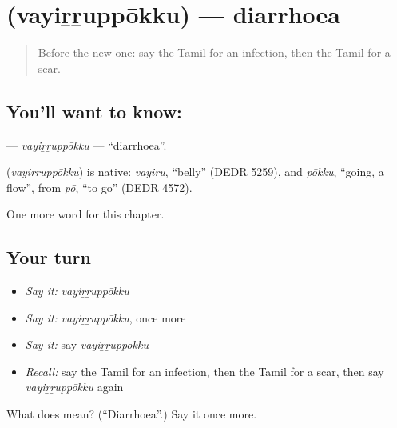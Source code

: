 \section[\texorpdfstring{\ta{வயிற்றுப்போக்கு} (vayiṟṟuppōkku)}{வயிற்றுப்போக்கு (vayiṟṟuppōkku)}]{ (vayiṟṟuppōkku) — diarrhoea}

\label{lesson:TA-C170-vayirruppokku}



\begin{quote}
Before the new one: say the Tamil for an infection, then the Tamil for a scar.
\end{quote}

\subsection*{You'll want to know: }
\textbf{} — \emph{vayiṟṟuppōkku} — \textquotedblleft{}diarrhoea\textquotedblright{}.

\begin{cousinweb}
\textbf{} (\emph{vayiṟṟuppōkku}) is native: \emph{vayiṟu}, \textquotedblleft{}belly\textquotedblright{} (DEDR 5259), and \emph{pōkku}, \textquotedblleft{}going, a flow\textquotedblright{}, from \emph{pō}, \textquotedblleft{}to go\textquotedblright{} (DEDR 4572).
\end{cousinweb}

\begin{grammarlens}[title={What you've built}]
One more word for this chapter.
\end{grammarlens}

\subsection*{Your turn}
\begin{itemize}
\raggedright
  \item \emph{Say it:} \emph{vayiṟṟuppōkku}
  \item \emph{Say it:} \emph{vayiṟṟuppōkku}, once more
  \item \emph{Say it:} say \emph{vayiṟṟuppōkku}
  \item \emph{Recall:} say the Tamil for an infection, then the Tamil for a scar, then say \emph{vayiṟṟuppōkku} again
\end{itemize}

\begin{tcolorbox}[breakable,colback=teal!4,colframe=teal!35!black,title={Before you move on}]
What does  mean? (\textquotedblleft{}Diarrhoea\textquotedblright{}.) Say it once more.
\end{tcolorbox}
